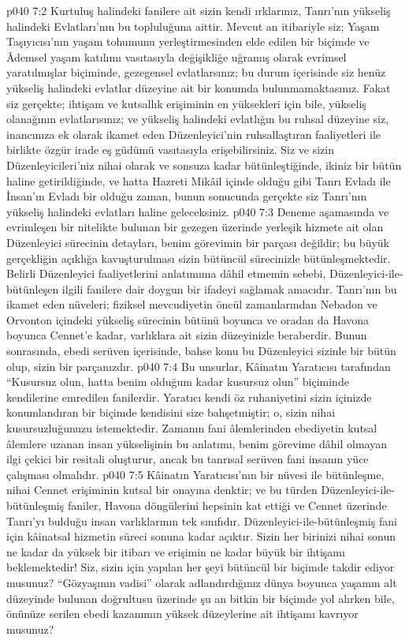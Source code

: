 \vs p040 7:2 Kurtuluş halindeki fanilere ait sizin kendi ırklarınız, Tanrı’nın yükseliş halindeki Evlatları’nın bu topluluğuna aittir. Mevcut an itibariyle siz; Yaşam Taşıyıcısı’nın yaşam tohumunu yerleştirmesinden elde edilen bir biçimde ve Âdemsel yaşam katılımı vasıtasıyla değişikliğe uğramış olarak evrimsel yaratılmışlar biçiminde, gezegensel evlatlarsınız; bu durum içerisinde siz henüz yükseliş halindeki evlatlar düzeyine ait bir konumda bulunmamaktasınız. Fakat siz gerçekte; ihtişam ve kutsallık erişiminin en yüksekleri için bile, yükseliş olanağının evlatlarısınız; ve yükseliş halindeki evlatlığın bu ruhsal düzeyine siz, inancınıza ek olarak ikamet eden Düzenleyici’nin ruhsallaştıran faaliyetleri ile birlikte özgür irade eş güdümü vasıtasıyla erişebilirsiniz. Siz ve sizin Düzenleyicileri’niz nihai olarak ve sonsuza kadar bütünleştiğinde, ikiniz bir bütün haline getirildiğinde, ve hatta Hazreti Mikâil içinde olduğu gibi Tanrı Evladı ile İnsan’ın Evladı bir olduğu zaman, bunun sonucunda gerçekte siz Tanrı’nın yükseliş halindeki evlatları haline geleceksiniz.
\vs p040 7:3 Deneme aşamasında ve evrimleşen bir nitelikte bulunan bir gezegen üzerinde yerleşik hizmete ait olan Düzenleyici sürecinin detayları, benim görevimin bir parçası değildir; bu büyük gerçekliğin açıklığa kavuşturulması sizin bütüncül sürecinizle bütünleşmektedir. Belirli Düzenleyici faaliyetlerini anlatımıma dâhil etmemin sebebi, Düzenleyici\hyp{}ile\hyp{}bütünleşen ilgili fanilere dair doygun bir ifadeyi sağlamak amacıdır. Tanrı’nın bu ikamet eden nüveleri; fiziksel mevcudiyetin öncül zamanlarından Nebadon ve Orvonton içindeki yükseliş sürecinin bütünü boyunca ve oradan da Havona boyunca Cennet’e kadar, varlıklara ait sizin düzeyinizle beraberdir. Bunun sonrasında, ebedi serüven içerisinde, bahse konu bu Düzenleyici sizinle bir bütün olup, sizin bir parçanızdır.
\vs p040 7:4 Bu unsurlar, Kâinatın Yaratıcısı tarafından “Kusursuz olun, hatta benim olduğum kadar kusursuz olun” biçiminde kendilerine emredilen fanilerdir. Yaratıcı kendi öz ruhaniyetini sizin içinizde konumlandıran bir biçimde kendisini size bahşetmiştir;  o, sizin nihai kusursuzluğunuzu istemektedir. Zamanın fani âlemlerinden ebediyetin kutsal âlemlere uzanan insan yükselişinin bu anlatımı, benim görevime dâhil olmayan ilgi çekici bir resitali oluşturur, ancak bu tanrısal serüven fani insanın yüce çalışması olmalıdır.
\vs p040 7:5 Kâinatın Yaratıcısı’nın bir nüvesi ile bütünleşme, nihai Cennet erişiminin kutsal bir onayına denktir; ve bu türden Düzenleyici\hyp{}ile\hyp{}bütünleşmiş faniler, Havona döngülerini hepsinin kat ettiği ve Cennet üzerinde Tanrı’yı bulduğu insan varlıklarının tek sınıfıdır. Düzenleyici\hyp{}ile\hyp{}bütünleşmiş fani için kâinatsal hizmetin süreci sonuna kadar açıktır. Sizin her birinizi nihai sonun ne kadar da yüksek bir itibarı ve erişimin ne kadar büyük bir ihtişamı beklemektedir! Siz, sizin için yapılan her şeyi bütüncül bir biçimde takdir ediyor musunuz? “Gözyaşının vadisi” olarak adlandırdığınız dünya boyunca yaşamın alt düzeyinde bulunan doğrultusu üzerinde şu an bitkin bir biçimde yol alırken bile, önünüze serilen ebedi kazanımın yüksek düzeylerine ait ihtişamı kavrıyor musunuz?

